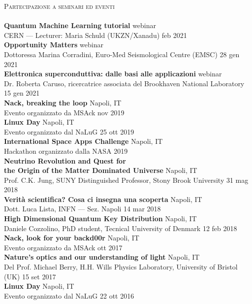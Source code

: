 \documentclass[a4paper]{article}
\newcommand{\lineunder} {
  \vspace*{-8pt} \\
  \hspace*{-18pt} \hrulefill \\
}
\newcommand{\header} [1] {
  {\hspace*{-18pt}\vspace*{6pt} \textsc{#1}}
  \vspace*{-6pt} \lineunder
}
\begin{document}
\header{Partecipazione a seminari ed eventi}
\textbf{Quantum Machine Learning tutorial} \hfill webinar\\
CERN --- Lecturer: Maria Schuld (UKZN/Xanadu) \hfill feb 2021\\
\vspace*{2mm}
\textbf{Opportunity Matters} \hfill webinar \\
Dottoressa Marina Corradini,
Euro-Med Seismological Centre (EMSC)
\hfill 28 gen 2021 \\
\vspace*{2mm}
\textbf{Elettronica superconduttiva: dalle basi alle applicazioni}
\hfill webinar \\
Dr. Roberta Caruso, ricercatrice associata del Brookhaven National Laboratory
\hfill 15 gen 2021 \\
\vspace*{2mm}
\textbf{Nack, breaking the loop} \hfill Napoli, IT \\
Evento organizzato da MSAck \hfill nov 2019 \\
\vspace*{2mm}
\textbf{Linux Day} \hfill Napoli, IT \\
Evento organizzato dal NaLuG \hfill 25 ott 2019 \\
\vspace*{2mm}
\textbf{International Space Apps Challenge} \hfill Napoli, IT\\
Hackathon organizzato dalla NASA
\hfill 2019\\
\vspace*{2mm}
\textbf{Neutrino Revolution and Quest for \\ the Origin of the Matter Dominated Universe} \hfill Napoli, IT \\
Prof. C.K. Jung, SUNY Distinguished Professor, Stony Brook University
\hfill 31 mag 2018 \\
\vspace*{2mm}
\textbf{Verità scientifica? Cosa ci insegna una scoperta}
\hfill Napoli, IT \\
Dott. Luca Lista, INFN --- Sez. Napoli
\hfill 14 mar 2018 \\
\vspace*{2mm}
\textbf{High Dimensional Quantum Key Distribution} \hfill Napoli, IT \\
Daniele Cozzolino, PhD student, Tecnical University of Denmark
\hfill 12 feb 2018 \\
\vspace*{2mm}
\textbf{Nack, look for your backd00r} \hfill Napoli, IT \\
Evento organizzato da MSAck \hfill ott 2017  \\
\vspace*{2mm}
\textbf{Nature's optics and our understanding of light} \hfill Napoli, IT \\
Del Prof. Michael Berry,
H.H. Wills Physics Laboratory,
University of Bristol (UK) \hfill 15 set 2017 \\
\vspace*{2mm}
\textbf{Linux Day} \hfill Napoli, IT \\
Evento organizzato dal NaLuG \hfill 22 ott 2016 \\
\vspace*{2mm}
\end{document}
